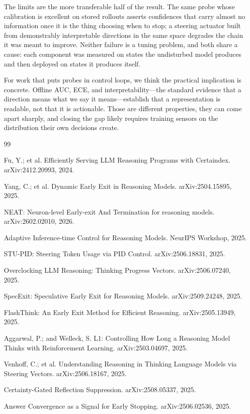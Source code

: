The limits are the more transferable half of the result. The same probe whose
calibration is excellent on stored rollouts asserts confidences that carry
almost no information once it is the thing choosing when to stop; a steering
actuator built from demonstrably interpretable directions in the same space
degrades the chain it was meant to improve. Neither failure is a tuning
problem, and both share a cause: each component was measured on states the
undisturbed model produces and then deployed on states it produces itself.

For work that puts probes in control loops, we think the practical implication
is concrete. Offline AUC, ECE, and interpretability---the standard evidence
that a direction means what we say it means---establish that a representation
is readable, not that it is actionable. Those are different properties, they
can come apart sharply, and closing the gap likely requires training sensors
on the distribution their own decisions create.

\begin{thebibliography}{99}
\small

Fu, Y.; et al.
\newblock Efficiently Serving LLM Reasoning Programs with Certaindex.
\newblock arXiv:2412.20993, 2024.

Yang, C.; et al.
\newblock Dynamic Early Exit in Reasoning Models.
\newblock arXiv:2504.15895, 2025.

NEAT: Neuron-level Early-exit And Termination for reasoning models.
\newblock arXiv:2602.02010, 2026.

Adaptive Inference-time Control for Reasoning Models.
\newblock NeurIPS Workshop, 2025.

STU-PID: Steering Token Usage via PID Control.
\newblock arXiv:2506.18831, 2025.

Overclocking LLM Reasoning: Thinking Progress Vectors.
\newblock arXiv:2506.07240, 2025.

SpecExit: Speculative Early Exit for Reasoning Models.
\newblock arXiv:2509.24248, 2025.

FlashThink: An Early Exit Method for Efficient Reasoning.
\newblock arXiv:2505.13949, 2025.

Aggarwal, P.; and Welleck, S.
\newblock L1: Controlling How Long a Reasoning Model Thinks with
Reinforcement Learning.
\newblock arXiv:2503.04697, 2025.

Venhoff, C.; et al.
\newblock Understanding Reasoning in Thinking Language Models via Steering
Vectors.
\newblock arXiv:2506.18167, 2025.

Certainty-Gated Reflection Suppression.
\newblock arXiv:2508.05337, 2025.

Answer Convergence as a Signal for Early Stopping.
\newblock arXiv:2506.02536, 2025.

\end{thebibliography}


